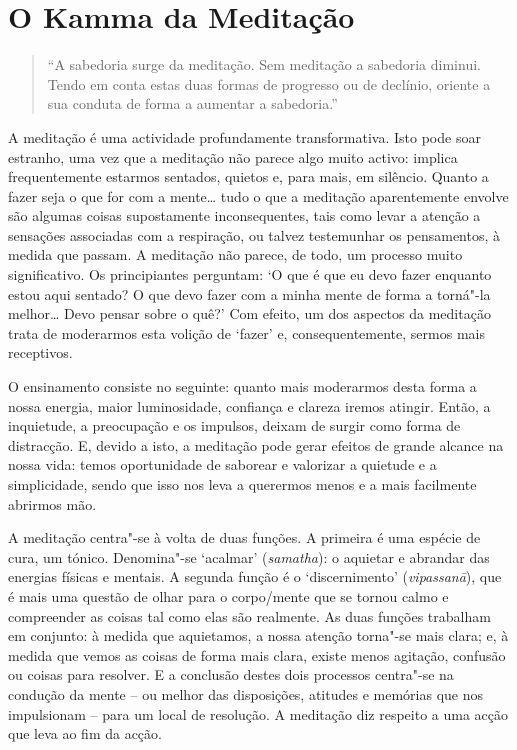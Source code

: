 
\chapter{O Kamma da Meditação}


\begin{quote}
  ``A sabedoria surge da meditação. Sem meditação a sabedoria diminui.
  Tendo em conta estas duas formas de progresso ou de declínio, oriente a sua conduta
  de forma a aumentar a sabedoria.''

\end{quote}

A meditação é uma actividade profundamente transformativa. Isto pode soar
estranho, uma vez que a meditação não parece algo muito activo: implica
frequentemente estarmos sentados, quietos e, para mais, em silêncio. Quanto a
fazer seja o que for com a mente\ldots{} tudo o que a meditação aparentemente
envolve são algumas coisas supostamente inconsequentes, tais como levar a
atenção a sensações associadas com a respiração, ou talvez testemunhar os
pensamentos, à medida que passam. A meditação não parece, de todo, um processo
muito significativo. Os principiantes perguntam: `O que é que eu devo fazer
enquanto estou aqui sentado? O que devo fazer com a minha mente de forma a
torná"-la melhor\ldots{} Devo pensar sobre o quê?' Com efeito, um dos aspectos da
meditação trata de moderarmos esta volição de `fazer' e, consequentemente,
sermos mais receptivos.

O ensinamento consiste no seguinte: quanto mais moderarmos desta forma a nossa
energia, maior luminosidade, confiança e clareza iremos atingir. Então, a
inquietude, a preocupação e os impulsos, deixam de surgir como forma de
distracção. E, devido a isto, a meditação pode gerar efeitos de grande alcance
na nossa vida: temos oportunidade de saborear e valorizar a quietude e a
simplicidade, sendo que isso nos leva a querermos menos e a mais facilmente
abrirmos mão.

A meditação centra"-se à volta de duas funções. A primeira é uma espécie de cura,
um tónico. Denomina"-se `acalmar' (\emph{samatha}): o aquietar e abrandar das
energias físicas e mentais. A segunda função é o `discernimento'
(\emph{vipassanā}), que é mais uma questão de olhar para o corpo/mente que se
tornou calmo e compreender as coisas tal como elas são realmente. As duas
funções trabalham em conjunto: à medida que aquietamos, a nossa atenção torna"-se
mais clara; e, à medida que vemos as coisas de forma mais clara, existe menos
agitação, confusão ou coisas para resolver. E a conclusão destes dois processos
centra"-se na condução da mente -- ou melhor das disposições, atitudes e memórias
que nos impulsionam -- para um local de resolução. A meditação diz respeito a
uma acção que leva ao fim da acção.

